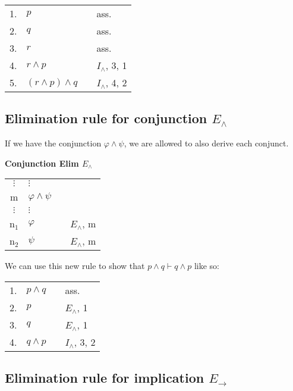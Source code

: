 \documentclass[nobib,nofonts]{tufte-handout}
\begin{document}
\begin{tabular}{clcl}
  1. & $p$ & & ass. \\
  2. & $q$ & & ass. \\
  3. & $r$ & & ass. \\
  4. & $r \wedge p$ & & $I_{\wedge}$, 3, 1  \\
  5. & $(r \wedge p) \wedge q$ & & $I_{\wedge}$, 4, 2  \\
\end{tabular}


\subsection{Elimination rule for conjunction $E_{\wedge}$}

If we have the conjunction $\varphi \wedge \psi$, we are allowed to also derive each conjunct.

\bigskip
\noindent \colorbox{mygray!60}{\centering
  \begin{minipage}[t]{0.35\linewidth}
    \textbf{Conjunction Elim $E_{\wedge}$}
  \end{minipage}
  \begin{minipage}[t]{0.55\linewidth}
    \begin{tabular}{clcl}
      $\vdots$ & $\vdots$              & \\
      m        & $\varphi \wedge \psi$ &  \\
      $\vdots$ & $\vdots$              & \\
      n$_{1}$  & $\varphi$             & & $E_{\wedge}$, m \\
      n$_{2}$  & $\psi$                & & $E_{\wedge}$, m
    \end{tabular}
  \end{minipage}
}
\bigskip

We can use this new rule to show that $p \wedge q \vdash q \wedge p$ like so:

\begin{tabular}{clcl}
  1. & $p \wedge q$ & & ass. \\
  2. & $p$          & & $E_{\wedge}$, 1 \\
  3. & $q$          & & $E_{\wedge}$, 1 \\
  4. & $q \wedge p$ & & $I_{\wedge}$, 3, 2
\end{tabular}


\subsection{Elimination rule for implication $E_{\rightarrow}$}
\end{document}

